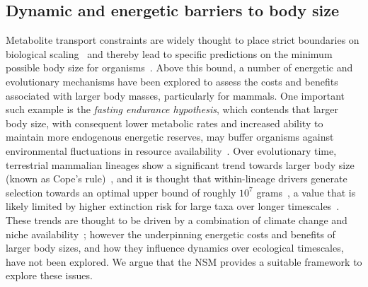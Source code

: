 \documentclass[twocolumn,preprintnumbers,amsmath,amssymb,superscriptaddress]{revtex4}
\begin{document}
\begin{bibunit}[unsrt]
\section*{Dynamic and energetic barriers to body size}
Metabolite transport constraints are widely thought to place strict boundaries on biological scaling~\cite{Brown:1993p708,West:1997cg,Brown:2004wq} and thereby lead to specific predictions on the minimum possible body size for organisms~\cite{West:2002ud}.
Above this bound, a number of energetic and evolutionary mechanisms have been explored to assess the costs and benefits associated with larger body masses, particularly for mammals.
One important such example is the \emph{fasting endurance hypothesis}, which contends that larger body size, with consequent lower metabolic rates and increased ability to maintain more endogenous energetic reserves, may buffer organisms against environmental fluctuations in resource availability~\cite{Millar:1990p923}.
Over evolutionary time, terrestrial mammalian lineages show a significant trend towards larger body size (known as Cope's rule)~\cite{Alroy:1998p1594,Clauset:2009fh,Smith:2010p3442,Saarinen:2014br}, and it is thought that within-lineage drivers generate selection towards an optimal upper bound of roughly $10^7$ grams~\cite{Alroy:1998p1594}, a value that is likely limited by higher extinction risk for large taxa over longer timescales~\cite{Clauset:2009fh}.
These trends are thought to be driven by a combination of climate change and niche availability~\cite{Saarinen:2014br}; however the underpinning energetic costs and benefits of larger body sizes, and how they influence dynamics over ecological timescales, have not been explored.
We argue that the NSM provides a suitable framework to explore these issues.


\end{bibunit}
\end{document}
